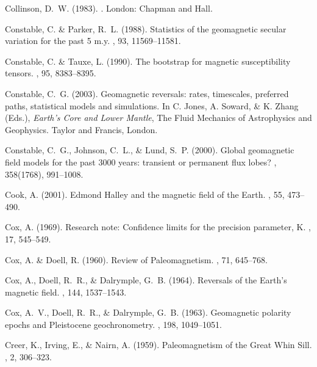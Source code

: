 Collinson, D.~W. (1983).
.
\newblock London: Chapman and Hall.

Constable, C. \& Parker, R.~L. (1988).
\newblock Statistics of the geomagnetic secular variation for the past 5 m.y.
, 93, 11569--11581.

Constable, C. \& Tauxe, L. (1990).
\newblock The bootstrap for magnetic susceptibility tensors.
, 95, 8383--8395.

Constable, C.~G. (2003).
\newblock Geomagnetic reversals: rates, timescales, preferred paths,
  statistical models and simulations.
\newblock In C. Jones, A. Soward, \& K. Zhang (Eds.), {\em Earth's Core and
  Lower Mantle}, The Fluid Mechanics of Astrophysics and Geophysics. Taylor and
  Francis, London.

Constable, C.~G., Johnson, C.~L., \& Lund, S.~P. (2000).
\newblock Global geomagnetic field models for the past 3000 years: transient or
  permanent flux lobes?
, 358(1768), 991--1008.

Cook, A. (2001).
\newblock Edmond Halley and the magnetic field of the Earth.
, 55, 473--490.

Cox, A. (1969).
\newblock Research note: Confidence limits for the precision parameter, K.
, 17, 545--549.

Cox, A. \& Doell, R. (1960).
\newblock Review of Paleomagnetism.
, 71, 645--768.

Cox, A., Doell, R.~R., \& Dalrymple, G.~B. (1964).
\newblock Reversals of the Earth's magnetic field.
, 144, 1537--1543.

Cox, A.~V., Doell, R.~R., \& Dalrymple, G.~B. (1963).
\newblock Geomagnetic polarity epochs and Pleistocene geochronometry.
, 198, 1049--1051.

Creer, K., Irving, E., \& Nairn, A. (1959).
\newblock Paleomagnetism of the Great Whin Sill.
, 2, 306--323.

